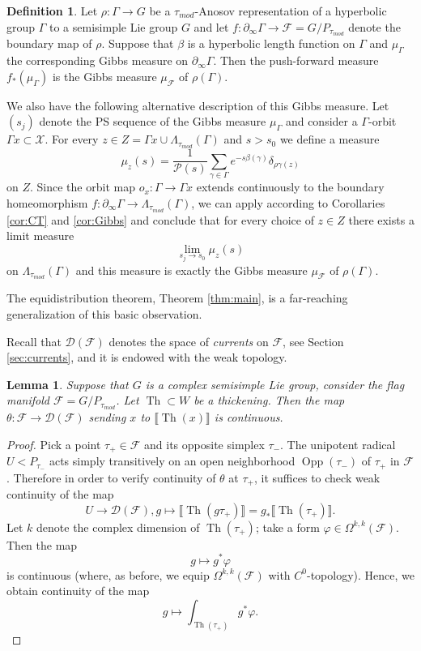 \documentclass[12pt]{amsbook}%
\newtheorem{lem}[thm]{Lemma}
\theoremstyle{definition}
\newtheorem{defi}[thm]{Definition}
\theoremstyle{remark}
\numberwithin{section}{chapter}
\numberwithin{subsection}{section}
\numberwithin{figure}{chapter}
\DeclareMathOperator{\Th}{Th}
\DeclareMathOperator{\Opp}{Opp}
\def\taumod{\tau_{mod}}
\def\cD{{\mathscr{D}}}
\def\cF{{\mathscr{F}}}
\def\cP{{\mathscr{P}}}
\def\cX{{\mathscr{X}}}
\def\Ga{\Gamma}
\def\La{\Lambda}
\def\Om{\Omega}
\def\geo{\partial_\infty}
\begin{document}
{{\begin{defi}\label{def:Anosov Gibbs}
Let $\rho: \Ga\to G$ be a $\taumod$-Anosov representation of a hyperbolic group $\Ga$ to a semisimple Lie group $G$ and let 
$f: \geo \Ga\to \cF= G/P_{\taumod}$ denote the boundary map of $\rho$. Suppose that $\beta$ is a hyperbolic length function on $\Ga$ and $\mu_{\Ga}$ 
the corresponding Gibbs measure on $\geo \Ga$. 
Then the push-forward measure $f_*(\mu_{\Ga})$ is the Gibbs measure $\mu_{\cF}$ of $\rho(\Ga)$. 
\end{defi}


We also have the following alternative description of this Gibbs measure. 
Let $(s_j)$ denote the PS sequence of the Gibbs measure $\mu_{\Ga}$ and consider 
 a $\Ga$-orbit $\Ga x\subset \cX$. For every $z\in Z=\Ga x\cup \La_{\taumod}(\Ga)$ 
 and $s>s_0$ we define a measure 
$$
\mu_{z}(s) = \frac{1}{\cP(s)}\sum_{\gamma\in \Gamma}e^{-s\beta(\gamma)}\delta_{\rho\gamma(z)} 
$$
on $Z$. Since the orbit map $o_x: {\Ga}\to \Ga x$ extends continuously to the boundary homeomorphism 
 $f: \geo \Ga\to \La_{\taumod}(\Ga)$, we can apply according to Corollaries \ref{cor:CT} and \ref{cor:Gibbs} and conclude 
 that  for every choice of $z\in Z$ there exists a limit measure
$$
\lim_{s_j\to s_0} \mu_{z}(s)
$$
on $\La_{\taumod}(\Ga)$ and this measure is exactly  the Gibbs measure $\mu_{\cF}$ of $\rho(\Ga)$. 
 
The equidistribution theorem, Theorem \ref{thm:main}, is a far-reaching generalization of this basic observation.  

Recall that $\cD(\cF)$ denotes the space of {\em currents} on $\cF$, see Section \ref{sec:currents}, and it is endowed with the weak topology. 

\begin{lem}\label{lem:weakly continuous}
Suppose that $G$ is a complex semisimple Lie group, consider the flag manifold $\cF= G/P_{\taumod}$. 
Let $\Th\subset W$ be a thickening. Then the map $\theta: \cF \to {\mathcal D}(\cF)$ sending $x$ to 
$\llbracket \Th(x)\rrbracket$ is continuous.
\end{lem}
\begin{proof} Pick a point $\tau_+\in \cF$ and its opposite simplex $\tau_-$. The unipotent radical $U< P_{\tau_-}$ 
acts simply transitively on an open neighborhood $\Opp(\tau_-)$ of $\tau_+$ in $\cF$. 
Therefore in order to verify continuity of $\theta$ at $\tau_+$, 
it suffices to check weak continuity of the map 
$$
U\to {\mathcal D}(\cF), g\mapsto \llbracket \Th(g\tau_+)\rrbracket =g_* \llbracket \Th(\tau_+)\rrbracket . 
$$
Let $k$ denote the complex dimension of $\Th(\tau_+)$; take a form $\varphi\in \Om^{k,k}(\cF)$. Then the map 
$$
g\mapsto g^*\varphi
$$
is continuous (where, as before, we equip $ \Om^{k,k}(\cF)$ with $C^0$-topology). Hence, we obtain continuity of the map 
$$
g\mapsto \int_{\Th(\tau_+)} g^*\varphi. 
$$
\end{proof}


}}
\end{document}
